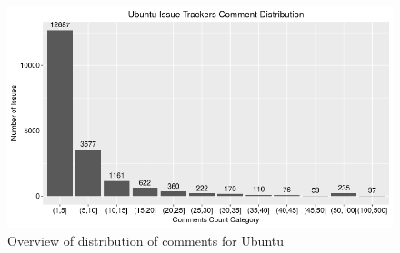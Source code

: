 \documentclass[a4paper,12pt,twoside]{report}
\begin{document}
\begin{figure}[h] %
    \centering
    \includegraphics[width=13cm]{ubuntu-comment-distribution-raw}
    \caption{Overview of distribution of comments for Ubuntu}
    \label{fig:ubuntuRawDistro}
\end{figure}
 


\end{document}
